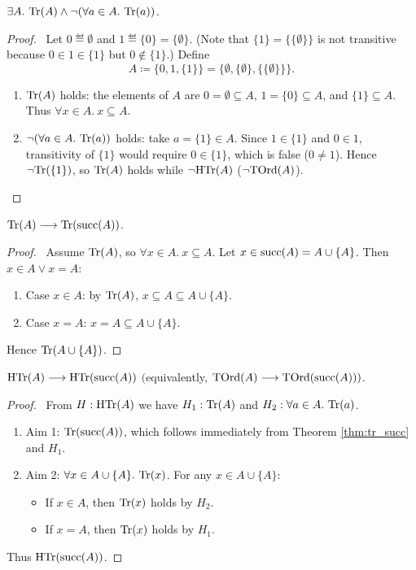 \documentclass[10pt,a4paper]{article}
\renewcommand{\myprf}{\begin{proof}}
\renewcommand{\myqed}{\end{proof}}
\begin{document}
\begin{theorem}
$\exists A.\ {\textrm{Tr}}(A) \land \neg (\forall a\in A.\ {\textrm{Tr}}(a))$.
\end{theorem}
\myprf\ Let $0 \eqdef \emptyset$ and $1 \eqdef \{0\} = \{\emptyset\}$. (Note that $\{1\} = \{\{\emptyset\}\}$ is not transitive because $0 \in 1 \in \{1\}$ but $0 \notin \{1\}$.) Define
$$A \coloneqq \{0, 1, \{1\}\} = \{\emptyset, \{\emptyset\}, \{\{\emptyset\}\}\}.$$
\begin{enumerate}
\item ${\textrm{Tr}}(A)$ holds: the elements of $A$ are $0 = \emptyset \subseteq A$, $1 = \{0\} \subseteq A$, and $\{1\} \subseteq A$. Thus $\forall x \in A.\ x \subseteq A$.
\item $\neg (\forall a \in A.\ \Tr(a))$ holds: take $a = \{1\} \in A$. Since $1 \in \{1\}$ and $0 \in 1$, transitivity of $\{1\}$ would require $0 \in \{1\}$, which is false ($0 \neq 1$). Hence $\neg {\textrm{Tr}}(\{1\})$, so ${\textrm{Tr}}(A)$ holds while $\neg {\textrm{HTr}}(A)$ ($\neg {\textrm{TOrd}}(A)$).
\end{enumerate}
\myqed

\begin{theorem}\label{thm:tr_succ}
${\textrm{Tr}}(A) \longrightarrow {\textrm{Tr}}({\textrm{succ}}(A))$.
\end{theorem}
\myprf\ Assume ${\textrm{Tr}}(A)$, so $\forall x\in A.\ x\subseteq A$. Let $x \in {\textrm{succ}}(A) = A\cup\{A\}$. Then $x\in A \lor x=A$:
\begin{enumerate}
\item Case $x\in A$: by ${\textrm{Tr}}(A)$, $x\subseteq A \subseteq A\cup\{A\}$.
\item Case $x = A$: $x = A \subseteq A\cup\{A\}$.
\end{enumerate}
Hence ${\textrm{Tr}}(A\cup\{A\})$. \myqed

\begin{theorem}\label{thm:tord_succ}
${\textrm{HTr}}(A) \longrightarrow {\textrm{HTr}}({\textrm{succ}}(A))$ \quad $($equivalently, ${\textrm{TOrd}}(A) \longrightarrow {\textrm{TOrd}}({\textrm{succ}}(A)))$.
\end{theorem}
\myprf\ From $H: {\textrm{HTr}}(A)$ we have $H_1: {\textrm{Tr}}(A)$ and $H_2: \forall a\in A.\ {\textrm{Tr}}(a)$.
\begin{enumerate}
\item Aim 1: ${\textrm{Tr}}({\textrm{succ}}(A))$, which follows immediately from Theorem \ref{thm:tr_succ} and $H_1$.
\item Aim 2: $\forall x\in A\cup\{A\}.\ \Tr(x)$. For any $x \in A \cup \{A\}$:
  \begin{itemize}
  \item If $x\in A$, then ${\textrm{Tr}}(x)$ holds by $H_2$.
  \item If $x = A$, then ${\textrm{Tr}}(x)$ holds by $H_1$.
  \end{itemize}
\end{enumerate}
Thus ${\textrm{HTr}}({\textrm{succ}}(A))$. \myqed
\end{document}

